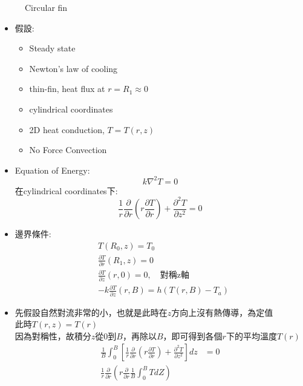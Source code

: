 \documentclass[../main.tex]{subfiles}
\begin{document}
\begin{itemize}
\begin{figure}[H]
\begin{tikzpicture}[>=Latex, line cap=round, line join=round, thick]
      \end{tikzpicture}
      \caption{Circular fin}
    \end{figure}
    \begin{itemize}
      \item 假設:
      \begin{itemize}
        \item Steady state
        \item Newton's law of cooling
        \item thin-fin, heat flux at $r=R_1\approx 0$
        \item cylindrical coordinates
        \item 2D heat conduction, $T=T(r,z)$
        \item No Force Convection
      \end{itemize}
      \item Equation of Energy:
      \begin{equation}
        k\nabla^2 T = 0
      \end{equation}
      在cylindrical coordinates下:
      \begin{equation}
        \frac{1}{r}\frac{\partial}{\partial r}\left(r \frac{\partial T}{\partial r}\right) + \frac{\partial^2 T}{\partial z^2} = 0 \label{eq:circular_fin_Bessel_PDE}
      \end{equation}
      \item 邊界條件:
      \begin{align}
        & T(R_0, z) = T_0 \\
        & \frac{\partial T}{\partial r}(R_1,z) = 0\\
        & \frac{\partial T}{\partial z}(r,0) = 0,\quad\text{對稱z軸}\\
        & -k\frac{\partial T}{\partial z}(r,B) = h(T(r,B) - T_a)
      \end{align}
      \item 先假設自然對流非常的小，也就是此時在$z$方向上沒有熱傳導，為定值\\
      此時$T(r,z) = T(r)$\\
      因為對稱性，故積分$z$從0到$B$，再除以$B$，即可得到各個$r$下的平均溫度$T(r)$
      \begin{align}
        \frac{1}{B}\int_0^B \left[
          \frac{1}{r}\frac{\partial}{\partial r}\left(r \frac{\partial T}{\partial r}\right) + \frac{\partial^2 T}{\partial z^2}
        \right]　 dz &= 0 \nonumber\\
        \frac{1}{r}\frac{\partial }{\partial r}\left(r\frac{\partial}{\partial r}\frac{1}{B}\int_0^B TdZ\right)

\end{align}
\end{itemize}
\end{itemize}
\end{document}
